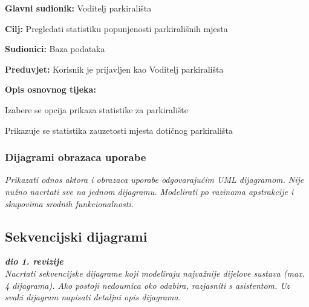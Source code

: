                         \noindent {}
					\begin{packed_item}
	
						\item \textbf{Glavni sudionik: }Voditelj parkirališta
						\item  \textbf{Cilj:} Pregledati statistiku popunjenosti parkirališnih mjesta
						\item  \textbf{Sudionici:} Baza podataka
						\item  \textbf{Preduvjet:} Korisnik je prijavljen kao Voditelj parkirališta
						\item  \textbf{Opis osnovnog tijeka:}
						
						\item[] \begin{packed_enum}
	
							\item Izabere se opcija prikaza statistike za parkiralište
							\item Prikazuje se statistika zauzetosti mjesta dotičnog parkirališta
							
							
						\end{packed_enum}

					\end{packed_item}

				
					
				\subsubsection{Dijagrami obrazaca uporabe}
					
					\textit{Prikazati odnos aktora i obrazaca uporabe odgovarajućim UML dijagramom. Nije nužno nacrtati sve na jednom dijagramu. Modelirati po razinama apstrakcije i skupovima srodnih funkcionalnosti.}
				\eject		
				
			\subsection{Sekvencijski dijagrami}
				
				\textbf{\textit{dio 1. revizije}}\\
				
				\textit{Nacrtati sekvencijske dijagrame koji modeliraju najvažnije dijelove sustava (max. 4 dijagrama). Ako postoji nedoumica oko odabira, razjasniti s asistentom. Uz svaki dijagram napisati detaljni opis dijagrama.}
				\eject
	
